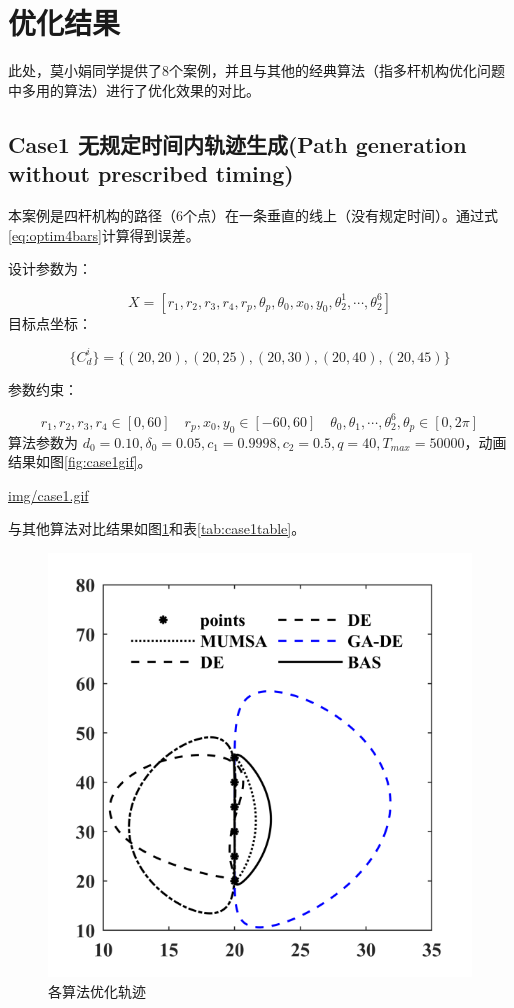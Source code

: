 \documentclass[]{ctexbook}
\theoremstyle{definition}
\theoremstyle{definition}
\theoremstyle{definition}
\theoremstyle{remark}
\begin{document}
\section{优化结果}

此处，莫小娟同学提供了8个案例，并且与其他的经典算法（指多杆机构优化问题中多用的算法）进行了优化效果的对比。

\subsection{Case1 无规定时间内轨迹生成(Path generation without
prescribed
timing)}\label{case1-path-generation-without-prescribed-timing}

本案例是四杆机构的路径（6个点）在一条垂直的线上（没有规定时间）。通过式\eqref{eq:optim4bars}计算得到误差。

设计参数为：

\[
X = [r_1,r_2,r_3,r_4,r_p,\theta_p,\theta_0,x_0,y_0,\theta_2^1,\cdots,\theta_2^6]
\] 目标点坐标：

\[
\{C_d^i\} = \{(20,20),(20,25),(20,30),(20,40),(20,45)\}
\]

参数约束：

\[
r_1,r_2,r_3,r_4\in[0,60]\quad r_p,x_0,y_0\in[-60,60]\quad \theta_0,\theta_1,\cdots,\theta_2^6,\theta_p\in[0,2\pi]
\] 算法参数为
\(d_0 = 0.10,\delta_0=0.05,c_1=0.9998,c_2=0.5,q=40,T_{max}=50000\)，动画结果如图\ref{fig:case1gif}。

\url{img/case1.gif}

与其他算法对比结果如图\ref{fig:case1png}和表\ref{tab:case1table}。

\begin{figure}

{\centering \includegraphics[width=0.5\linewidth]{img/case1png} 

}

\caption{各算法优化轨迹}\label{fig:case1png}
\end{figure}
\end{document}
